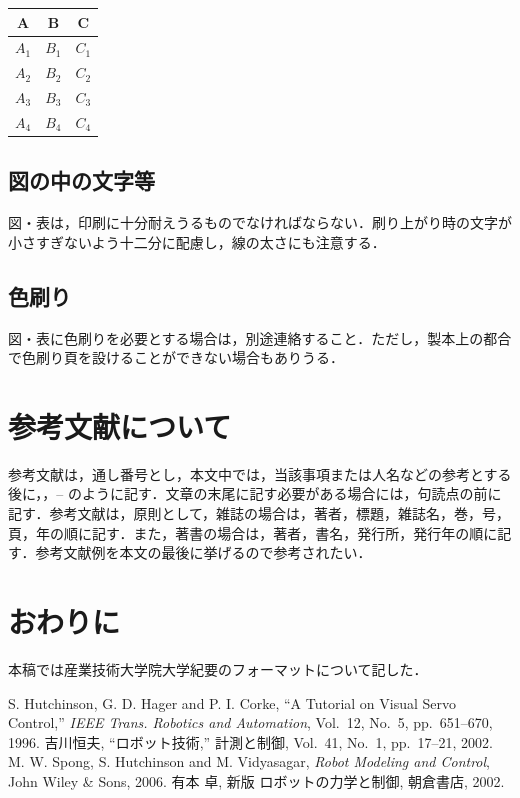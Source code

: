 \documentclass[a4j,twoside]{jarticle}
\begin{document}
\begin{multicols}{2}
\label{tab:cost2}
\begin{center}
\begin{tabular}{|c|c|c|} \hline
A & B & C \\ \hline
$A_{1}$ & $B_{1}$ & $C_{1}$ \\ \hline
$A_{2}$ & $B_{2}$ & $C_{2}$ \\ \hline
$A_{3}$ & $B_{3}$ & $C_{3}$ \\ \hline
$A_{4}$ & $B_{4}$ & $C_{4}$ \\ \hline
\end{tabular}
\end{center}

\subsection{図の中の文字等}
 図・表は，印刷に十分耐えうるものでなければならない．刷り上がり時の文字が小さすぎないよう十二分に配慮し，線の太さにも注意する．

\subsection{色刷り}
図・表に色刷りを必要とする場合は，別途連絡すること．ただし，製本上の都合で色刷り頁を設けることができない場合もありうる．

\section{参考文献について}
参考文献は，通し番号とし，本文中では，当該事項または人名などの参考とする
後に，\cite{TRA96HuHaCo}，\cite{SICE02Yo}--\cite{Asa02Ar} のように記す．文章の末尾に記す必要がある場合には，句読点の前に記す．参考文献は，原則として，雑誌の場合は，著者，標題，雑誌名，巻，号，頁，年の順に記す．また，著書の場合は，著者，書名，発行所，発行年の順に記す．参考文献例を本文の最後に挙げるので参考されたい．

\section{おわりに}
本稿では産業技術大学院大学紀要のフォーマットについて記した．

\begin{thebibliography}{99}
S. Hutchinson, G. D. Hager and P. I. Corke,
``A Tutorial on Visual Servo Control,''
{\it IEEE Trans. Robotics and Automation},
Vol.~12, No.~5, pp.~651--670, 1996.
%
吉川恒夫,
``ロボット技術,''
計測と制御, Vol.~41, No.~1, pp.~17--21, 2002.
%
M. W. Spong, S. Hutchinson and M. Vidyasagar, 
{\it Robot Modeling and Control}, 
John Wiley \& Sons, 2006. 
%
有本 卓, 新版 ロボットの力学と制御, 朝倉書店, 2002. 
\end{thebibliography}

\newpage %
\end{multicols}
\end{document}

